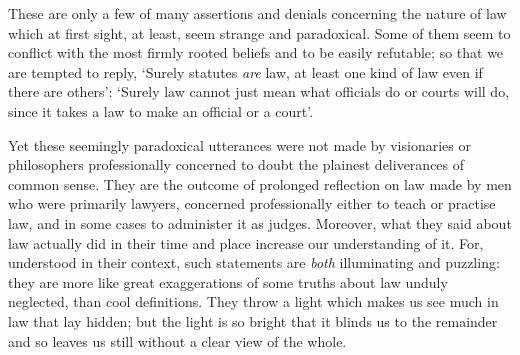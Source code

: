 These are only a few of many assertions and denials concerning the
nature of law which at first sight, at least, seem strange and
paradoxical. Some of them seem to conflict with the most firmly rooted
beliefs and to be easily refutable; so that we are tempted to reply,
`Surely statutes \emph{are} law, at least one kind of law even if there
are others': `Surely law cannot just mean what officials do or courts
will do, since it takes a law to make an official or a court'.

Yet these seemingly paradoxical utterances were not made by visionaries
or philosophers professionally concerned to doubt the plainest
deliverances of common sense. They are the outcome of prolonged
reflection on law made by men who were primarily lawyers, concerned
professionally either to teach or practise law, and in some cases to
administer it as judges. Moreover, what they said about law actually did
in their time and place increase our understanding of it. For,
understood in their context, such statements are \emph{both}
illuminating and puzzling: they are more like great exaggerations of
some truths about law unduly neglected, than cool definitions. They
throw a light which makes us see much in law that lay hidden; but the
light is so bright that it blinds us to the remainder and so leaves us
still without a clear view of the whole.

